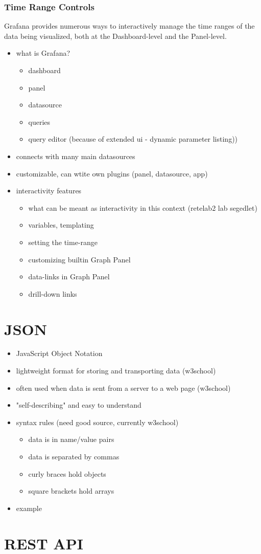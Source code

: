\subsubsection{Time Range Controls}

Grafana provides numerous ways to interactively manage the time ranges of the data being visualized, both at the Dashboard-level and the Panel-level.


\begin{itemize}
	\item what is Grafana?
	\begin{itemize}
		\item dashboard
		\item panel
		\item datasource
		\item queries
		\item query editor (because of extended ui - dynamic parameter listing))
	\end{itemize}
	\item connects with many main datasources
	\item customizable, can wtite own plugins (panel, datasource, app)
	\item interactivity features
	\begin{itemize}
		\item what can be meant as interactivity in this context (retelab2 lab segedlet)
		\item variables, templating
		\item setting the time-range
		\item customizing builtin Graph Panel
		\item data-links in Graph Panel
		\item drill-down links
	\end{itemize}
\end{itemize}



\section{JSON}

\begin{itemize}
	\item JavaScript Object Notation
	\item lightweight format for storing and transporting data (w3school)
	\item often used when data is sent from a server to a web page (w3school)
	\item "self-describing" and easy to understand
	\item syntax rules (need good source, currently w3school)
	\begin{itemize}
		\item data is in name/value pairs
		\item data is separated by commas
		\item curly braces hold objects
		\item square brackets hold arrays
	\end{itemize}
	\item example
\end{itemize}


\section{REST API}
